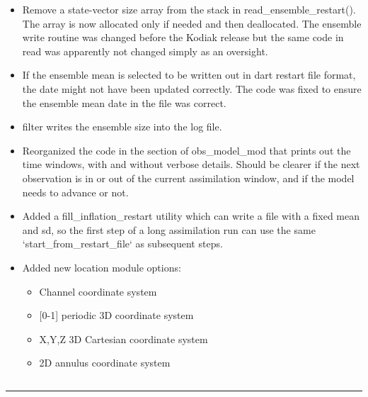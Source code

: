 \documentclass[letterpaper,10pt,english]{sphinxmanual}
\begin{document}
\begin{itemize}
\item {} 
Remove a state-vector size array from the stack in
read\_ensemble\_restart(). The array is now allocated only if needed
and then deallocated. The ensemble write routine was changed before
the Kodiak release but the same code in read was apparently not
changed simply as an oversight.

\item {} 
If the ensemble mean is selected to be written out in dart restart
file format, the date might not have been updated correctly. The
code was fixed to ensure the ensemble mean date in the file was
correct.

\item {} 
filter writes the ensemble size into the log file.

\item {} 
Reorganized the code in the section of obs\_model\_mod that prints
out the time windows, with and without verbose details. Should be
clearer if the next observation is in or out of the current
assimilation window, and if the model needs to advance or not.

\item {} 
Added a fill\_inflation\_restart utility which can write a file with
a fixed mean and sd, so the first step of a long assimilation run
can use the same `start\_from\_restart\_file` as subsequent steps.

\item {} 
Added new location module options:
\begin{itemize}
\item {} 
Channel coordinate system

\item {} 
{[}0-1{]} periodic 3D coordinate system

\item {} 
X,Y,Z 3D Cartesian coordinate system

\item {} 
2D annulus coordinate system

\end{itemize}

\end{itemize}


\subsection{\textbar{}}
\label{docs/Lanai_diffs_from_Kodiak:id1}

\bigskip\hrule{}\bigskip
\end{document}
